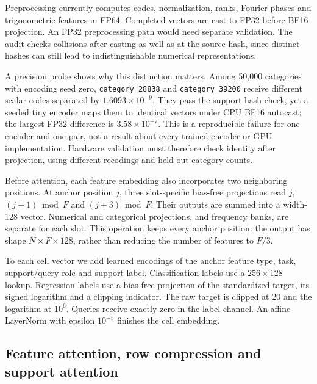 \documentclass[11pt]{article}
\begin{document}
Preprocessing currently computes codes, normalization, ranks, Fourier phases and trigonometric features in FP64. Completed vectors are cast to FP32 before BF16 projection. An FP32 preprocessing path would need separate validation. The audit checks collisions after casting as well as at the source hash, since distinct hashes can still lead to indistinguishable numerical representations.

A precision probe shows why this distinction matters. Among 50,000 categories with encoding seed zero, \texttt{category\_28838} and \texttt{category\_39200} receive different scalar codes separated by $1.6093\times10^{-9}$. They pass the support hash check, yet a seeded tiny encoder maps them to identical vectors under CPU BF16 autocast; the largest FP32 difference is $3.58\times10^{-7}$. This is a reproducible failure for one encoder and one pair, not a result about every trained encoder or GPU implementation. Hardware validation must therefore check identity after projection, using different recodings and held-out category counts.

Before attention, each feature embedding also incorporates two neighboring positions. At anchor position $j$, three slot-specific bias-free projections read $j$, $(j+1)\bmod F$ and $(j+3)\bmod F$. Their outputs are summed into a width-128 vector. Numerical and categorical projections, and frequency banks, are separate for each slot. This operation keeps every anchor position: the output has shape $N\times F\times128$, rather than reducing the number of features to $F/3$.

To each cell vector we add learned encodings of the anchor feature type, task, support/query role and support label. Classification labels use a $256\times128$ lookup. Regression labels use a bias-free projection of the standardized target, its signed logarithm and a clipping indicator. The raw target is clipped at 20 and the logarithm at $10^6$. Queries receive exactly zero in the label channel. An affine LayerNorm with epsilon $10^{-5}$ finishes the cell embedding.

\subsection{Feature attention, row compression and support attention}
\label{sec:attention}
\end{document}
